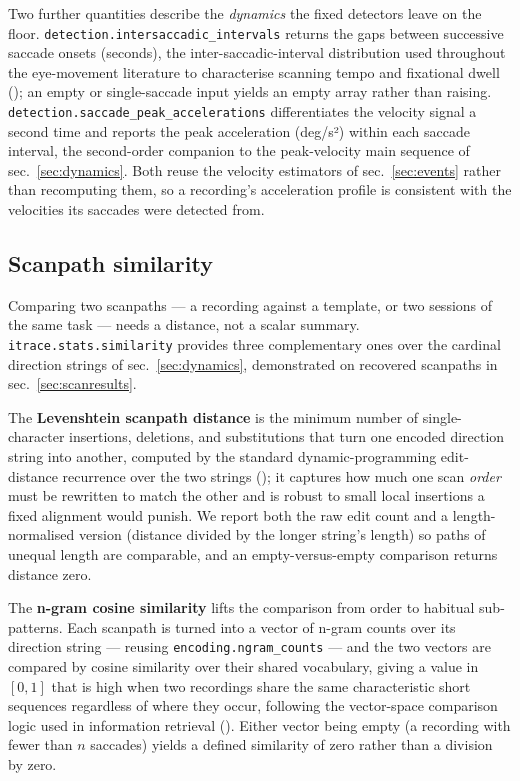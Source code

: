 \documentclass[
]{article}
\begin{document}
Two further quantities describe the \emph{dynamics} the fixed detectors
leave on the floor. \texttt{detection.intersaccadic\_intervals} returns
the gaps between successive saccade onsets (seconds), the
inter-saccadic-interval distribution used throughout the eye-movement
literature to characterise scanning tempo and fixational dwell
(); an empty or
single-saccade input yields an empty array rather than raising.
\texttt{detection.saccade\_peak\_accelerations} differentiates the
velocity signal a second time and reports the peak acceleration (deg/s²)
within each saccade interval, the second-order companion to the
peak-velocity main sequence of sec.~\ref{sec:dynamics}. Both reuse the
velocity estimators of sec.~\ref{sec:events} rather than recomputing
them, so a recording's acceleration profile is consistent with the
velocities its saccades were detected from.

\subsection{Scanpath similarity}\label{scanpath-similarity}

Comparing two scanpaths --- a recording against a template, or two
sessions of the same task --- needs a distance, not a scalar summary.
\texttt{itrace.stats.similarity} provides three complementary ones over
the cardinal direction strings of sec.~\ref{sec:dynamics}, demonstrated
on recovered scanpaths in sec.~\ref{sec:scanresults}.

The \textbf{Levenshtein scanpath distance} is the minimum number of
single-character insertions, deletions, and substitutions that turn one
encoded direction string into another, computed by the standard
dynamic-programming edit-distance recurrence over the two strings
(); it captures
how much one scan \emph{order} must be rewritten to match the other and
is robust to small local insertions a fixed alignment would punish. We
report both the raw edit count and a length-normalised version (distance
divided by the longer string's length) so paths of unequal length are
comparable, and an empty-versus-empty comparison returns distance zero.

The \textbf{n-gram cosine similarity} lifts the comparison from order to
habitual sub-patterns. Each scanpath is turned into a vector of n-gram
counts over its direction string --- reusing
\texttt{encoding.ngram\_counts} --- and the two vectors are compared by
cosine similarity over their shared vocabulary, giving a value in
\([0, 1]\) that is high when two recordings share the same
characteristic short sequences regardless of where they occur, following
the vector-space comparison logic used in information retrieval
(). Either vector
being empty (a recording with fewer than \(n\) saccades) yields a
defined similarity of zero rather than a division by zero.
\end{document}
